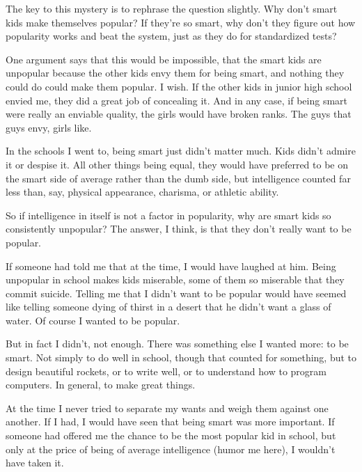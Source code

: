                   The key to this mystery is to rephrase the question slightly.
                  Why don't smart kids make themselves popular? If they're so
                  smart, why don't they figure out how popularity works and beat
                  the system, just as they do for standardized tests?

One
                  argument says that this would be impossible, that the smart
                  kids are unpopular because the other kids envy them for being
                  smart, and nothing they could do could make them popular. I
                  wish. If the other kids in junior high school envied me, they
                  did a great job of concealing it. And in any case, if being
                  smart were really an enviable quality, the girls would have
                  broken ranks. The guys that guys envy, girls like.

In
                  the schools I went to, being smart just didn't matter much.
                  Kids didn't admire it or despise it. All other things being
                  equal, they would have preferred to be on the smart side of
                  average rather than the dumb side, but intelligence counted
                  far less than, say, physical appearance, charisma, or athletic
                  ability.

So if intelligence in itself is not a
                  factor in popularity, why are smart kids so consistently
                  unpopular? The answer, I think, is that they don't really want
                  to be popular.

If someone had told me that at the
                  time, I would have laughed at him. Being unpopular in school
                  makes kids miserable, some of them so miserable that they
                  commit suicide. Telling me that I didn't want to be popular
                  would have seemed like telling someone dying of thirst in a
                  desert that he didn't want a glass of water. Of course I
                  wanted to be popular.

But in fact I didn't, not
                  enough. There was something else I wanted more: to be smart.
                  Not simply to do well in school, though that counted for
                  something, but to design beautiful rockets, or to write well,
                  or to understand how to program computers. In general, to make
                  great things.

At the time I never tried to separate
                  my wants and weigh them against one another. If I had, I would
                  have seen that being smart was more important. If someone had
                  offered me the chance to be the most popular kid in school,
                  but only at the price of being of average intelligence (humor
                  me here), I wouldn't have taken it.

